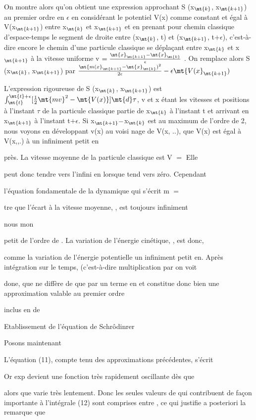 On montre alors qu'on obtient une expression approchant S (x$_\mt{k}$, x$_\mt{k+1}$)
au premier ordre en $\epsilon$ en considérant le potentiel V(x)
comme constant et égal à V(x$_\mt{k+1}$) entre x$_\mt{k}$ et x$_\mt{k+1}$ et en prenant pour
chemin classique d'espace-temps le segment de droite entre (x$_\mt{k}$, t) et
(x$_\mt{k+1}$, t$+\epsilon$), c'est-à-dire encore le chemin d'une particule classique se
déplaçant entre x$_\mt{k}$ et x$_\mt{k+1}$ à la vitesse uniforme
v $= \frac{\mt{x}_\mt{k+1} - \mt{x}_\mt{k}}{\epsilon}$ . On remplace alors
S (x$_\mt{k}$, x$_\mt{k+1}$)  par
$\frac{\mt{m(x}_\mt{k+1} - \mt{x}_\mt{k})^2}{2\epsilon} - \epsilon\mt{V(x}_\mt{k+1})$

L'expression rigoureuse de S (x$_\mt{k}$, x$_\mt{k+1}$) est
$\int_\mt{t}^{\mt{t}+\epsilon}[\frac{1}{2}\mt{mv}^2 - \mt{V(x)}]\mt{d}\tau$, v et x
étant les vitesses et positions à l'instant $\tau$ de la particule classique
partie de x$_\mt{k}$ à l'instant t et arrivant en x$_\mt{k+1}$ à l'instant t$+\epsilon$. Si 
x$_\mt{k+1}-$x$_\mt{k}$
est au maximum de l'ordre de 2, nous voyons en développant v(x) au voisi
nage de V(x, ..), que V(x) est égal à V(x,,.) à un infiniment petit en 

près. La vitesse moyenne de la particule classique est V $=$  Elle

peut donc tendre vers l'infini en  lorsque  tend vers zéro. Cependant

l'équation fondamentale de la dynamique qui s'écrit m  $=$

tre que l'écart à la vitesse moyenne,  , est toujours infiniment

nous mon

petit de l'ordre de . La variation de l'énergie cinétique, , est donc,

comme la variation de l'énergie potentielle un infiniment petit en.
Après intégration sur le temps, (c'est-à-dire multiplication par on voit

done, que ne diffère de  que par un terme
en et constitue donc bien une approximation valable au premier ordre

inclus en  de 
%

Etablissement de l'équation de Schrôdinrer

Posons maintenant

L'équation (11), compte tenu des approximations précédentes, s'écrit

Or exp  devient une fonction très rapidement oscillante dès que

 alors que  varie très lentement. Donc les seules
valeurs de  qui contribuent de façon importante à l'intégrale (12) sont
comprises entre , ce qui justifie a posteriori la remarque que

